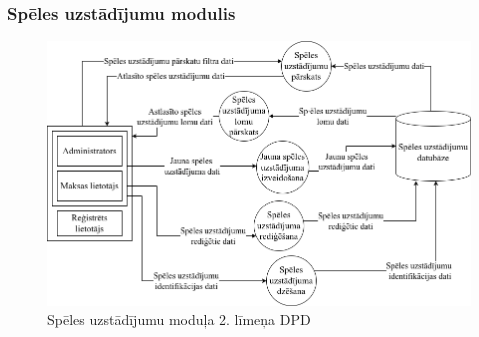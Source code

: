 \subsubsection{Spēles uzstādījumu modulis}

\begin{figure}[htbp]
	\centering
	\includegraphics[width=\linewidth]{./src/img/SpēlesUzstādījumuModulis.png}
	\caption{Spēles uzstādījumu moduļa 2. līmeņa DPD}
	\label{fig:dpd-2-game-setup}
\end{figure}






